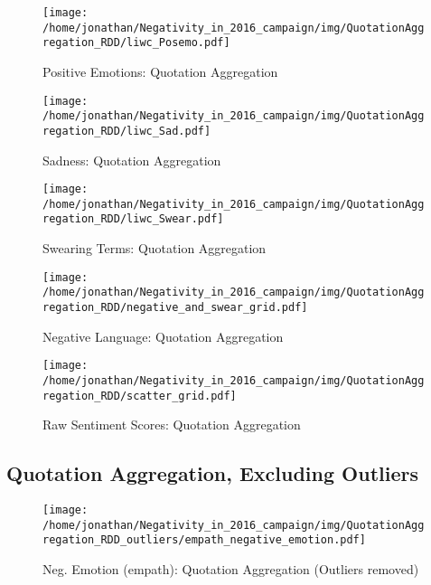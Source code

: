 \begin{figure}[h]\centering
	\texttt{[image: /home/jonathan/Negativity\_in\_2016\_campaign/img/QuotationAggregation\_RDD/liwc\_Posemo.pdf]}
	\caption{Positive Emotions: Quotation Aggregation}
	\label{fig: qa_Positive Emotions}
\end{figure}

\begin{figure}[h]\centering
	\texttt{[image: /home/jonathan/Negativity\_in\_2016\_campaign/img/QuotationAggregation\_RDD/liwc\_Sad.pdf]}
	\caption{Sadness: Quotation Aggregation}
	\label{fig: qa_Sadness}
\end{figure}

\begin{figure}[h]\centering
	\texttt{[image: /home/jonathan/Negativity\_in\_2016\_campaign/img/QuotationAggregation\_RDD/liwc\_Swear.pdf]}
	\caption{Swearing Terms: Quotation Aggregation}
	\label{fig: qa_Swearing Terms}
\end{figure}

\begin{figure}[h]\centering
	\texttt{[image: /home/jonathan/Negativity\_in\_2016\_campaign/img/QuotationAggregation\_RDD/negative\_and\_swear\_grid.pdf]}
	\caption{Negative Language: Quotation Aggregation}
	\label{fig: qa_Negative Language}
\end{figure}

\begin{figure}[h]\centering
	\texttt{[image: /home/jonathan/Negativity\_in\_2016\_campaign/img/QuotationAggregation\_RDD/scatter\_grid.pdf]}
	\caption{Raw Sentiment Scores: Quotation Aggregation}
	\label{fig: qa_Raw Sentiment Scores}
\end{figure}

\clearpage
\pagebreak

\subsection{Quotation Aggregation, Excluding Outliers}

\begin{figure}[h]\centering
	\texttt{[image: /home/jonathan/Negativity\_in\_2016\_campaign/img/QuotationAggregation\_RDD\_outliers/empath\_negative\_emotion.pdf]}
	\caption{Neg. Emotion (empath): Quotation Aggregation (Outliers removed)}
	\label{fig: qa_Neg. Emotion (empath)}
\end{figure}

